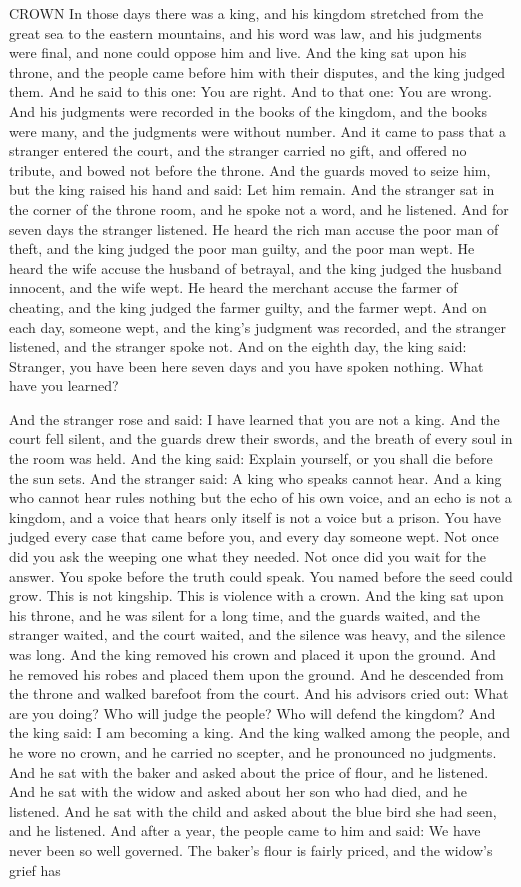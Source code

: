 \documentclass[12pt,openany]{book}
\begin{document}
CROWN In those days there was a king, and his kingdom stretched from the great sea to the eastern mountains, and his word was law, and his judgments were final, and none could oppose him and live. And the king sat upon his throne, and the people came before him with their disputes, and the king judged them. And he said to this one: You are right. And to that one: You are wrong. And his judgments were recorded in the books of the kingdom, and the books were many, and the judgments were without number. And it came to pass that a stranger entered the court, and the stranger carried no gift, and offered no tribute, and bowed not before the throne. And the guards moved to seize him, but the king raised his hand and said: Let him remain. And the stranger sat in the corner of the throne room, and he spoke not a word, and he listened. And for seven days the stranger listened. He heard the rich man accuse the poor man of theft, and the king judged the poor man guilty, and the poor man wept. He heard the wife accuse the husband of betrayal, and the king judged the husband innocent, and the wife wept. He heard the merchant accuse the farmer of cheating, and the king judged the farmer guilty, and the farmer wept. And on each day, someone wept, and the king's judgment was recorded, and the stranger listened, and the stranger spoke not. And on the eighth day, the king said: Stranger, you have been here seven days and you have spoken nothing. What have you learned?


And the stranger rose and said: I have learned that you are not a king. And the court fell silent, and the guards drew their swords, and the breath of every soul in the room was held. And the king said: Explain yourself, or you shall die before the sun sets. And the stranger said: A king who speaks cannot hear. And a king who cannot hear rules nothing but the echo of his own voice, and an echo is not a kingdom, and a voice that hears only itself is not a voice but a prison. You have judged every case that came before you, and every day someone wept. Not once did you ask the weeping one what they needed. Not once did you wait for the answer. You spoke before the truth could speak. You named before the seed could grow. This is not kingship. This is violence with a crown. And the king sat upon his throne, and he was silent for a long time, and the guards waited, and the stranger waited, and the court waited, and the silence was heavy, and the silence was long. And the king removed his crown and placed it upon the ground. And he removed his robes and placed them upon the ground. And he descended from the throne and walked barefoot from the court. And his advisors cried out: What are you doing? Who will judge the people? Who will defend the kingdom? And the king said: I am becoming a king. And the king walked among the people, and he wore no crown, and he carried no scepter, and he pronounced no judgments. And he sat with the baker and asked about the price of flour, and he listened. And he sat with the widow and asked about her son who had died, and he listened. And he sat with the child and asked about the blue bird she had seen, and he listened. And after a year, the people came to him and said: We have never been so well governed. The baker's flour is fairly priced, and the widow's grief has
\end{document}
